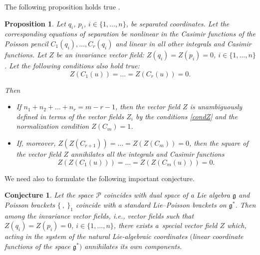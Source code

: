 \documentclass[10pt,a4paper]{amsart}
\numberwithin{equation}{section}
\newtheorem{Proposition}[Theorem]{Proposition}
\newtheorem{Conjecture}[Theorem]{Conjecture}
 { \theoremstyle{definition}
\newtheorem{Definition}[Theorem]{Definition}
\newtheorem{Note}[Theorem]{Note}
\newtheorem{Example}[Theorem]{Example}
\newtheorem{Remark}[Theorem]{Remark} }
\begin{document}
The following proposition holds true \cite{SkrAsSoVExCle}.

 \begin{Proposition}\label{Z}
 Let $q_i$, $p_i$, $i\in \{1,\dots, n\}$, be separated coordinates. Let the corresponding equations of separation be nonlinear in the Casimir functions of the Poisson pencil $C_1(q_i),\dots ,\allowbreak C_r(q_i)$ and linear in all other integrals and Casimir functions. Let $Z$ be an invariance vector field: $Z(q_i)=Z(p_i)=0$, $i\in \{1,\dots, n\}$. Let the following conditions also hold true:
 \begin{equation}\label{condZ}
 Z(C_1(u))= \dots =Z(C_r(u))=0.
 \end{equation}

 Then
\begin{itemize}\itemsep=0pt
\item[$(i)$] If
 $
n_1+n_2+ \dots +n_r=m-r-1$,
then the vector field $Z$ is unambiguously defined in terms of the vector fields $Z_i$ by the conditions \eqref{condZ} and the normalization condition $Z(C_m)=1$.


\item[$(ii)$] If, moreover, $Z(Z(C_{r+1}))=\dots =Z(Z(C_m))=0$, then the square of the vector field $Z$ annihilates all the integrals and Casimir functions
 \begin{equation}\label{quadZ1}
 Z(Z(C_1(u)))= \dots =Z(Z(C_m(u)))=0.
 \end{equation}
 \end{itemize}
 \end{Proposition}


We need also to formulate the following important conjecture.
\begin{Conjecture}\label{conj2} Let the space $\mathcal{P}$ coincides with dual space of a Lie algebra $\mathfrak{g}$ and Poisson brackets $\{\ ,\ \}_1$ coincide with a standard Lie--Poisson brackets on $\mathfrak{g}^*$.
Then among the invariance vector fields, i.e., vector fields such that $Z(q_i)=Z(p_i)=0$, $i\in \{1, \dots, n\}$, there exists a~special vector field $Z$
 which, acting in the system of the natural Lie-algebraic coordinates $($linear coordinate functions of the space $\mathfrak{g}^*)$ annihilates its own components.
\end{Conjecture}
\end{document}
